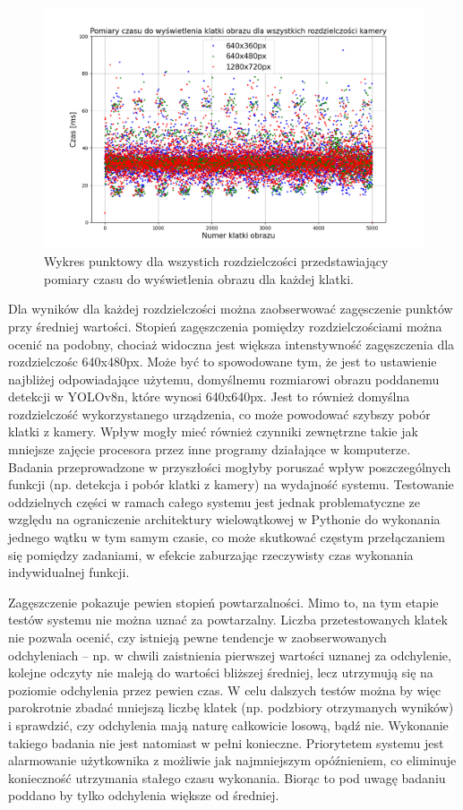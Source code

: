 \begin{figure}[H]
    \centering
    \includegraphics[width=\linewidth]{r_test_szybkosci/punkty/all.png}
    \caption{Wykres punktowy dla wszystich rozdzielczości przedstawiający pomiary czasu do wyświetlenia obrazu dla każdej klatki.}
    \label{fig:czas-punktowy-all}    
\end{figure}

Dla wyników dla każdej rozdzielczości można zaobserwować zagęsczenie punktów przy średniej wartości. 
Stopień zagęszczenia pomiędzy rozdzielczościami można ocenić na podobny, chociaż widoczna jest większa intenstywność zagęszczenia dla rozdzielczośc 640x480px. Może być to spowodowane tym, że jest to ustawienie najbliżej odpowiadające użytemu, domyślnemu rozmiarowi obrazu poddanemu detekcji w YOLOv8n, które wynosi 640x640px. Jest to również domyślna rozdzielczość wykorzystanego urządzenia, co może powodować szybszy pobór klatki z kamery.
Wpływ mogły mieć również czynniki zewnętrzne takie jak mniejsze zajęcie procesora przez inne programy działające w komputerze. Badania przeprowadzone w przyszłości mogłyby poruszać wpływ poszczególnych funkcji (np. detekcja i pobór klatki z kamery) na wydajność systemu. 
Testowanie oddzielnych części w ramach całego systemu jest jednak problematyczne ze względu na ograniczenie architektury wielowątkowej w Pythonie do wykonania jednego wątku w tym samym czasie, co może skutkować częstym przełączaniem się pomiędzy zadaniami, w efekcie zaburzając rzeczywisty czas wykonania indywidualnej funkcji.  

Zagęszczenie pokazuje pewien stopień powtarzalności. Mimo to, na tym etapie testów systemu nie można uznać za powtarzalny. Liczba przetestowanych klatek nie pozwala ocenić, czy istnieją pewne tendencje w zaobserwowanych odchyleniach -- np. w chwili zaistnienia pierwszej wartości uznanej za odchylenie, kolejne odczyty nie maleją do wartości bliższej średniej, lecz utrzymują się na poziomie odchylenia przez pewien czas. 
W celu dalszych testów można by więc parokrotnie zbadać mniejszą liczbę klatek (np. podzbiory otrzymanych wyników) i sprawdzić, czy odchylenia mają naturę całkowicie losową, bądź nie. Wykonanie takiego badania nie jest natomiast w pełni konieczne. Priorytetem systemu jest alarmowanie użytkownika z możliwie jak najmniejszym opóźnieniem, co eliminuje konieczność utrzymania stałego czasu wykonania. Biorąc to pod uwagę badaniu poddano by tylko odchylenia większe od średniej.

